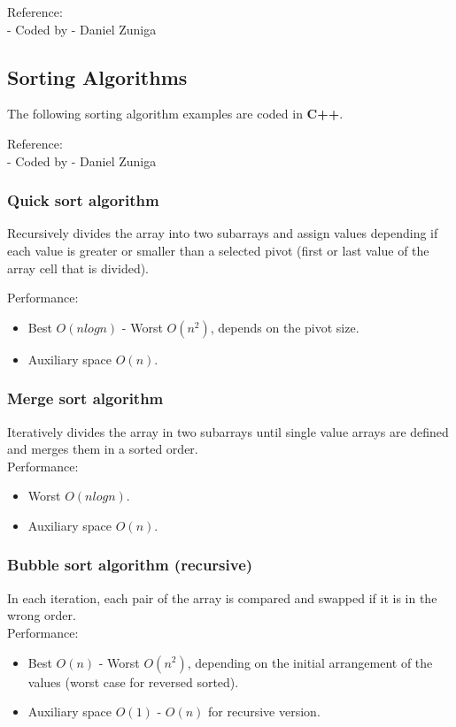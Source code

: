 \documentclass[10pt,bezier]{article}
\begin{document}
\noindent Reference:\\
- Coded by - Daniel Zuniga

\newpage
\subsection{Sorting Algorithms} \label{section5.2}
The following sorting algorithm examples are coded in {\color{blue}\textbf{C++}}.

\noindent Reference:\\
- Coded by - Daniel Zuniga

\subsubsection{Quick sort algorithm} \label{section5.2.2}
Recursively divides the array into two subarrays and assign values depending if each value is greater or smaller than a selected pivot (first or last value of the array cell that is divided).

Performance:
\begin{itemize}
  \item Best $O(n log n)$ - Worst $O(n^2)$, depends on the pivot size.
  \item Auxiliary space $O(n)$.
\end{itemize}

\subsubsection{Merge sort algorithm} \label{section5.2.3}
Iteratively divides the array in two subarrays until single value arrays are defined and merges them in a sorted order.\\

Performance:
\begin{itemize}
  \item Worst $O(n log n)$.
  \item Auxiliary space $O(n)$.
\end{itemize}

\subsubsection{Bubble sort algorithm (recursive)} \label{section5.2.4}
In each iteration, each pair of the array is compared and swapped if it is in the wrong order.\\

Performance:
\begin{itemize}
  \item Best $O(n)$ - Worst $O(n^2)$, depending on the initial arrangement of the values (worst case for reversed sorted).
  \item Auxiliary space $O(1)$ - $O(n)$ for recursive version.
\end{itemize}
\end{document}
